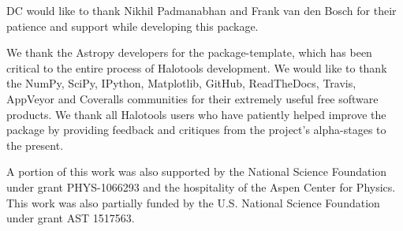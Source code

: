 \documentclass[twocolumn, tighten]{aastex6}
\begin{document}
DC would like to thank Nikhil Padmanabhan and Frank van den Bosch for their patience and support while developing this package.

We thank the Astropy developers for the package-template, which has been critical to the entire process of Halotools development. 
We would like to thank the NumPy, SciPy, IPython, Matplotlib, GitHub, ReadTheDocs, Travis, AppVeyor and Coveralls communities for their extremely useful free software products. We thank all Halotools users who have patiently helped improve the package by providing feedback and critiques from the project's alpha-stages to the present. 

A portion of this work was also supported by the National Science Foundation under grant PHYS-1066293 and the hospitality of the Aspen Center for Physics. This work was also partially funded by the U.S. National Science Foundation under grant AST 1517563. 












\end{document}
